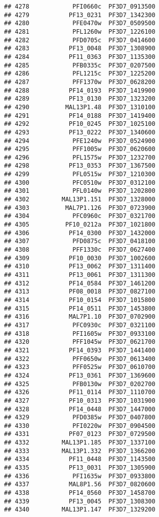 \documentclass{article}\usepackage[]{graphicx}\usepackage[]{color}
\makeatletter
\newenvironment{kframe}{%
 \def\at@end@of@kframe{}%
 \ifinner\ifhmode%
  \def\at@end@of@kframe{\end{minipage}}%
  \begin{minipage}{\columnwidth}%
 \fi\fi%
 \def\FrameCommand##1{\hskip\@totalleftmargin \hskip-\fboxsep
 \colorbox{shadecolor}{##1}\hskip-\fboxsep
     \hskip-\linewidth \hskip-\@totalleftmargin \hskip\columnwidth}%
 \MakeFramed {\advance\hsize-\width
   \@totalleftmargin\z@ \linewidth\hsize
   \@setminipage}}%
 {\par\unskip\endMakeFramed%
 \at@end@of@kframe}
\newenvironment{knitrout}{}{} %
\makeatother
\begin{document}
\begin{knitrout}
\begin{kframe}
\begin{verbatim}
## 4278            PFI0660c  PF3D7_0913500
## 4279           PF13_0231  PF3D7_1342300
## 4280            PFE0470w  PF3D7_0509500
## 4281            PFL1260w  PF3D7_1226100
## 4282            PFD0705c  PF3D7_0414600
## 4283           PF13_0048  PF3D7_1308900
## 4284           PF11_0363  PF3D7_1135300
## 4285            PFB0335c  PF3D7_0207500
## 4286            PFL1215c  PF3D7_1225200
## 4287            PFF1370w  PF3D7_0628200
## 4288           PF14_0193  PF3D7_1419900
## 4289           PF13_0130  PF3D7_1323200
## 4290          MAL13P1.48  PF3D7_1310100
## 4291           PF14_0188  PF3D7_1419400
## 4292           PF10_0245  PF3D7_1025100
## 4293           PF13_0222  PF3D7_1340600
## 4294            PFE1240w  PF3D7_0524900
## 4295            PFF1005w  PF3D7_0620600
## 4296            PFL1575w  PF3D7_1232700
## 4298           PF13_0353  PF3D7_1367500
## 4299            PFL0515w  PF3D7_1210300
## 4300            PFC0510w  PF3D7_0312100
## 4301            PFL0140w  PF3D7_1202800
## 4302         MAL13P1.151  PF3D7_1328000
## 4303          MAL7P1.126  PF3D7_0723900
## 4304            PFC0960c  PF3D7_0321700
## 4305          PF10_0212a  PF3D7_1021800
## 4306           PF14_0300  PF3D7_1432000
## 4307            PFD0875c  PF3D7_0418100
## 4308            PFF1330c  PF3D7_0627400
## 4309           PF10_0030  PF3D7_1002600
## 4310           PF13_0062  PF3D7_1311400
## 4311           PF13_0061  PF3D7_1311300
## 4312           PF14_0584  PF3D7_1461200
## 4313           PF08_0018  PF3D7_0827100
## 4314           PF10_0154  PF3D7_1015800
## 4315           PF14_0511  PF3D7_1453800
## 4316           MAL7P1.10  PF3D7_0702900
## 4317            PFC0930c  PF3D7_0321100
## 4318            PFI1605w  PF3D7_0933100
## 4320            PFF1045w  PF3D7_0621700
## 4321           PF14_0393  PF3D7_1441400
## 4322            PFF0650w  PF3D7_0613400
## 4323            PFF0525w  PF3D7_0610700
## 4324           PF13_0361  PF3D7_1369600
## 4325            PFB0130w  PF3D7_0202700
## 4326           PF11_0114  PF3D7_1110700
## 4327           PF10_0313  PF3D7_1031900
## 4328           PF14_0448  PF3D7_1447000
## 4329            PFD0385w  PF3D7_0407800
## 4330            PFI0220w  PF3D7_0904500
## 4331           PF07_0123  PF3D7_0729500
## 4332         MAL13P1.185  PF3D7_1337100
## 4333         MAL13P1.332  PF3D7_1366200
## 4334           PF11_0448  PF3D7_1143500
## 4335           PF13_0031  PF3D7_1305900
## 4336            PFI1635w  PF3D7_0933800
## 4337           MAL8P1.56  PF3D7_0820600
## 4338           PF14_0560  PF3D7_1458700
## 4339           PF13_0045  PF3D7_1308300
## 4340         MAL13P1.147  PF3D7_1329200

\end{verbatim}
\end{kframe}
\end{knitrout}
\end{document}
